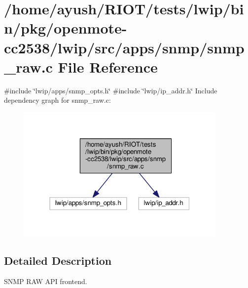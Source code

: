 \hypertarget{openmote-cc2538_2lwip_2src_2apps_2snmp_2snmp__raw_8c}{}\section{/home/ayush/\+R\+I\+O\+T/tests/lwip/bin/pkg/openmote-\/cc2538/lwip/src/apps/snmp/snmp\+\_\+raw.c File Reference}
\label{openmote-cc2538_2lwip_2src_2apps_2snmp_2snmp__raw_8c}
{\ttfamily \#include \char`\"{}lwip/apps/snmp\+\_\+opts.\+h\char`\"{}}\newline
{\ttfamily \#include \char`\"{}lwip/ip\+\_\+addr.\+h\char`\"{}}\newline
Include dependency graph for snmp\+\_\+raw.\+c\+:
\nopagebreak
\begin{figure}[H]
\begin{center}
\leavevmode
\includegraphics[width=292pt]{openmote-cc2538_2lwip_2src_2apps_2snmp_2snmp__raw_8c__incl}
\end{center}
\end{figure}


\subsection{Detailed Description}
S\+N\+MP R\+AW A\+PI frontend. 